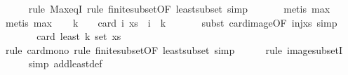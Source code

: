 \begin{isabellebody}
\ \ \ \ \isamarkupfalse%
\ {\isacharparenleft}{\kern0pt}rule\ Max{\isacharunderscore}{\kern0pt}eqI{\isacharcomma}{\kern0pt}\ rule\ finite{\isacharunderscore}{\kern0pt}subset{\isacharbrackleft}{\kern0pt}OF\ least{\isacharunderscore}{\kern0pt}subset{\isacharbrackright}{\kern0pt}{\isacharcomma}{\kern0pt}\ simp{\isacharparenright}{\kern0pt}\isanewline
\ \ \ \ \ \isamarkupfalse%
\ {\isacharparenleft}{\kern0pt}metis\ max{\isacharunderscore}{\kern0pt}{}{\isacharparenright}{\kern0pt}\isanewline
\ \ \ \ \isamarkupfalse%
\ {\isacharparenleft}{\kern0pt}metis\ max{\isacharunderscore}{\kern0pt}{}{\isacharparenright}{\kern0pt}\isanewline
\isanewline
\ \ \isamarkupfalse%
\ {\isachardoublequoteopen}k\ {\isacharplus}{\kern0pt}\ {}\ {\isacharequal}{\kern0pt}\ card\ {\isacharparenleft}{\kern0pt}{\isacharparenleft}{\kern0pt}{\isasymlambda}i{\isachardot}{\kern0pt}\ xs\ {\isacharbang}{\kern0pt}\ i{\isacharparenright}{\kern0pt}\ {\isacharbackquote}{\kern0pt}\ {\isacharbraceleft}{\kern0pt}{}{\isachardot}{\kern0pt}{\isachardot}{\kern0pt}k{\isacharbraceright}{\kern0pt}{\isacharparenright}{\kern0pt}{\isachardoublequoteclose}\ \isanewline
\ \ \ \ \isamarkupfalse%
\ {\isacharparenleft}{\kern0pt}subst\ card{\isacharunderscore}{\kern0pt}image{\isacharbrackleft}{\kern0pt}OF\ inj{\isacharunderscore}{\kern0pt}xs{\isacharbrackright}{\kern0pt}{\isacharcomma}{\kern0pt}\ simp{\isacharparenright}{\kern0pt}\ \isanewline
\ \ \isamarkupfalse%
\ \isamarkupfalse%
\ {\isachardoublequoteopen}{\isachardot}{\kern0pt}{\isachardot}{\kern0pt}{\isachardot}{\kern0pt}\ {\isasymle}\ card\ {\isacharparenleft}{\kern0pt}least\ {\isacharparenleft}{\kern0pt}k{\isacharplus}{\kern0pt}{}{\isacharparenright}{\kern0pt}\ {\isacharparenleft}{\kern0pt}set\ xs{\isacharparenright}{\kern0pt}{\isacharparenright}{\kern0pt}{\isachardoublequoteclose}\isanewline
\ \ \ \ \isamarkupfalse%
\ {\isacharparenleft}{\kern0pt}rule\ card{\isacharunderscore}{\kern0pt}mono{\isacharcomma}{\kern0pt}\ rule\ finite{\isacharunderscore}{\kern0pt}subset{\isacharbrackleft}{\kern0pt}OF\ least{\isacharunderscore}{\kern0pt}subset{\isacharbrackright}{\kern0pt}{\isacharcomma}{\kern0pt}\ simp{\isacharparenright}{\kern0pt}\isanewline
\ \ \ \ \isamarkupfalse%
\ {\isacharparenleft}{\kern0pt}rule\ image{\isacharunderscore}{\kern0pt}subsetI{\isacharparenright}{\kern0pt}\isanewline
\ \ \ \ \isamarkupfalse%
\ {\isacharparenleft}{\kern0pt}simp\ add{\isacharcolon}{\kern0pt}least{\isacharunderscore}{\kern0pt}def{\isacharparenright}{\kern0pt}\isanewline

\end{isabellebody}
